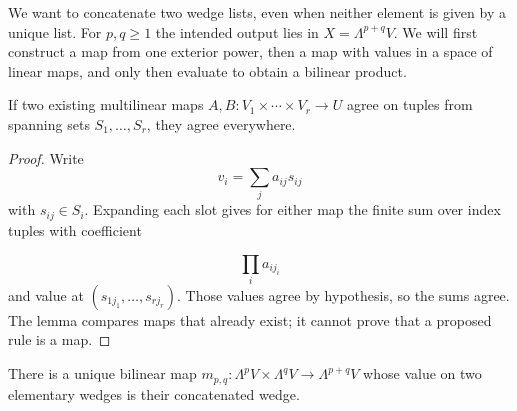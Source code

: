 We want to concatenate two wedge lists, even when neither element is
given by a unique list. For $p,q\geq1$ the intended output lies in
$X=\Lambda^{p+q}V$. We will first construct a map from one exterior
power, then a map with values in a space of linear maps, and only then
evaluate to obtain a bilinear product.
\begin{lemma}\label{lem:multilinear-spanning}
If two existing multilinear maps $A,B:V_1\times\cdots\times V_r\to U$
agree on tuples from spanning sets $S_1,\ldots,S_r$, they agree everywhere.
\end{lemma}
\begin{proof}
Write
\[
v_i=\sum_j a_{ij}s_{ij}
\]
 with $s_{ij}\in S_i$. Expanding each
slot gives for either map the finite sum over index tuples with coefficient

\[
\prod_i a_{ij_i}
\]
 and value at $(s_{1j_1},\ldots,s_{rj_r})$.
Those values agree by hypothesis, so the sums agree. The lemma compares
maps that already exist; it cannot prove that a proposed rule is a map.
\end{proof}
\begin{theorem}
There is a unique bilinear map
$m_{p,q}:\Lambda^pV\times\Lambda^qV\to\Lambda^{p+q}V$ whose value on
two elementary wedges is their concatenated wedge.
\end{theorem}
